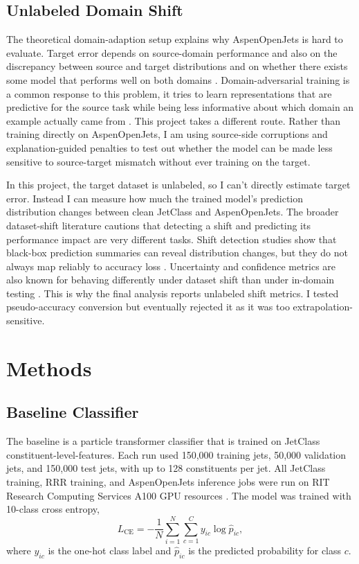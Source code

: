 \documentclass[11pt]{article}
\begin{document}
\subsection{Unlabeled Domain Shift}

The theoretical domain-adaption setup explains why AspenOpenJets is hard to evaluate. Target error depends on source-domain performance and also on the discrepancy between source and target distributions and on whether there exists some model that performs well on both domains \cite{bendavid2010theory}. Domain-adversarial training is a common response to this problem, it tries to learn representations that are predictive for the source task while being less informative about which domain an example actually came from \cite{ganin2015unsupervised}. This project takes a different route. Rather than training directly on AspenOpenJets, I am using source-side corruptions and explanation-guided penalties to test out whether the model can be made less sensitive to source-target mismatch without ever training on the target.

In this project, the target dataset is unlabeled, so I can’t directly estimate target error. Instead I can measure how much the trained model’s prediction distribution changes between clean JetClass and AspenOpenJets. The broader dataset-shift literature cautions that detecting a shift and predicting its performance impact are very different tasks. Shift detection studies show that black-box prediction summaries can reveal distribution changes, but they do not always map reliably to accuracy loss \cite{rabanser2019failing,guillory2021predicting}. Uncertainty and confidence metrics are also known for behaving differently under dataset shift than under in-domain testing \cite{ovadia2019trust}. This is why the final analysis reports unlabeled shift metrics. I tested pseudo-accuracy conversion but eventually rejected it as it was too extrapolation-sensitive.


\section{Methods}

\subsection{Baseline Classifier}


The baseline is a particle transformer classifier that is trained on JetClass constituent-level-features. Each run used 150,000 training jets, 50,000 validation jets, and 150,000 test jets, with up to 128 constituents per jet. All JetClass training, RRR training, and AspenOpenJets inference jobs were run on RIT Research Computing Services A100 GPU resources \cite{ritrc2026}. The model was trained with 10-class cross entropy,
\begin{equation}
L_{\mathrm{CE}} = -\frac{1}{N}\sum_{i=1}^{N}\sum_{c=1}^{C} y_{ic}\log \hat{p}_{ic},
\end{equation}
where $y_{ic}$ is the one-hot class label and $\hat{p}_{ic}$ is the predicted probability for class $c$.
\end{document}
